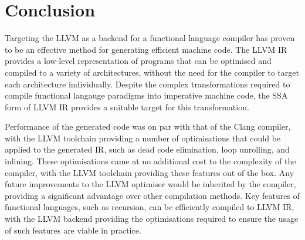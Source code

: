 \chapter{Conclusion}
\label{ch:conclusion}

Targeting the LLVM as a backend for a functional language compiler has proven to be an effective
method for generating efficient machine code. The LLVM IR provides a low-level representation of
programs that can be optimised and compiled to a variety of architectures, without the need for the
compiler to target each architecture individually. Despite the complex transformations required to
compile functional langauge paradigms into imperative machine code, the SSA form of LLVM IR provides
a suitable target for this transformation.

Performance of the generated code was on par with that of the Clang compiler, with the LLVM
toolchain providing a number of optimisations that could be applied to the generated IR, such as
dead code elimination, loop unrolling, and inlining. These optimisations came at no additional cost
to the complexity of the compiler, with the LLVM toolchain providing these features out of the box.
Any future improvements to the LLVM optimiser would be inherited by the compiler, providing a
significant advantage over other compilation methods. Key features of functional languages, such as
recursion, can be efficiently compiled to LLVM IR, with the LLVM backend providing the optimisations
required to ensure the usage of such features are viable in practice.


